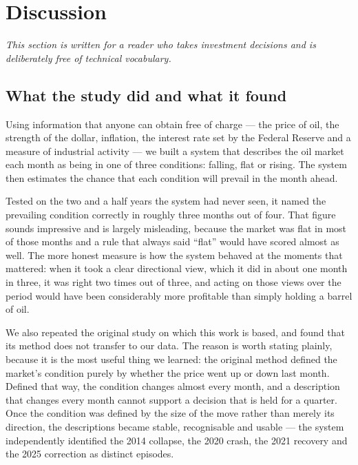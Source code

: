 \documentclass[11pt,a4paper]{article}
\begin{document}
\section{Discussion}

\textit{This section is written for a reader who takes investment decisions and is deliberately
free of technical vocabulary.}

\subsection{What the study did and what it found}

Using information that anyone can obtain free of charge --- the price of oil, the strength of the
dollar, inflation, the interest rate set by the Federal Reserve and a measure of industrial
activity --- we built a system that describes the oil market each month as being in one of three
conditions: falling, flat or rising. The system then estimates the chance that each condition will
prevail in the month ahead.

Tested on the two and a half years the system had never seen, it named the prevailing condition
correctly in roughly three months out of four. That figure sounds impressive and is largely
misleading, because the market was flat in most of those months and a rule that always said
``flat'' would have scored almost as well. The more honest measure is how the system behaved at the
moments that mattered: when it took a clear directional view, which it did in about one month in
three, it was right two times out of three, and acting on those views over the period would have
been considerably more profitable than simply holding a barrel of oil.

We also repeated the original study on which this work is based, and found that its method does not
transfer to our data. The reason is worth stating plainly, because it is the most useful thing we
learned: the original method defined the market's condition purely by whether the price went up or
down last month. Defined that way, the condition changes almost every month, and a description that
changes every month cannot support a decision that is held for a quarter. Once the condition was
defined by the size of the move rather than merely its direction, the descriptions became stable,
recognisable and usable --- the system independently identified the 2014 collapse, the 2020 crash,
the 2021 recovery and the 2025 correction as distinct episodes.
\end{document}
